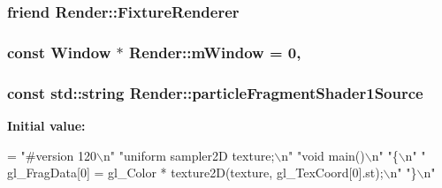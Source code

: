 \subsubsection[{Fixture\+Renderer}]{\setlength{\rightskip}{0pt plus 5cm}friend {\bf Render\+::\+Fixture\+Renderer}\hspace{0.3cm}{\ttfamily [private]}}\label{classRender_a5d7f62cb07edbd2d40faf2d8b00c7247}
\hypertarget{classRender_a6ad72a846871260c4da9e5aa9e337944}{}
\subsubsection[{m\+Window}]{\setlength{\rightskip}{0pt plus 5cm}const {\bf Window} $\ast$ Render\+::m\+Window = 0\hspace{0.3cm}{\ttfamily [static]}, {\ttfamily [private]}}\label{classRender_a6ad72a846871260c4da9e5aa9e337944}
\hypertarget{classRender_ada528ae821ea616fd860dae0e3410f64}{}
\subsubsection[{particle\+Fragment\+Shader1\+Source}]{\setlength{\rightskip}{0pt plus 5cm}const std\+::string Render\+::particle\+Fragment\+Shader1\+Source\hspace{0.3cm}{\ttfamily [private]}}\label{classRender_ada528ae821ea616fd860dae0e3410f64}
{\bfseries Initial value\+:}
\begin{DoxyCode}
=
        \textcolor{stringliteral}{"#version 120\(\backslash\)n"}
        \textcolor{stringliteral}{"uniform sampler2D texture;\(\backslash\)n"}
        \textcolor{stringliteral}{"void main()\(\backslash\)n"}
        \textcolor{stringliteral}{"\{\(\backslash\)n"}
        \textcolor{stringliteral}{"   gl\_FragData[0] = gl\_Color * texture2D(texture, gl\_TexCoord[0].st);\(\backslash\)n"}
        \textcolor{stringliteral}{"\}\(\backslash\)n"}
\end{DoxyCode}
\hypertarget{classRender_af249c6ab18c7af2bf8342333a8fb49e3}{}
